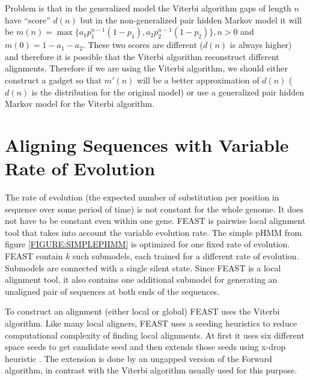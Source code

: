 Problem is that in the generalized model the Viterbi algorithm gaps of length
$n$ have ``score'' $d(n)$ but in the non-generalized pair hidden Markov model it
will be $m(n)=\max\{a_1p_1^{n-1}(1-p_1),a_2p_2^{n-1}(1-p_2)\}, n>0$ and
$m(0)=1-a_1-a_2$.  These two scores are different ($d(n)$ is always higher) and
therefore it is possible that the Viterbi algorithm reconstruct different
alignments. Therefore if we are using the Viterbi algorithm, we should either
construct a gadget so that $m'(n)$ will be a better approximation of $d(n)$
($d(n)$ is the distribution for the original model) or use a generalized pair
hidden Markov model for the Viterbi algorithm.


\section{Aligning Sequences with Variable Rate of Evolution}
\label{SECTION:FEAST} 

The rate of evolution (the expected number of substitution per position in
sequence over some period of time) is not constant for the whole genome. It does
not have to be constant even within one gene. FEAST is pairwise local alignment
tool \cite{FEAST2011} that takes into account the variable evolution rate. The
simple pHMM from figure \ref{FIGURE:SIMPLEPHMM} is optimized for one fixed rate
of evolution.  FEAST contain $k$ such submodels, each trained for a different
rate of evolution.  Submodels are connected with a single silent state.  Since
FEAST is a local alignment tool, it also contains one additional submodel for
generating an unaligned pair of  sequences  at both ends of the sequences.

To construct an alignment (either local or global) FEAST uses the Viterbi
algorithm. Like many local aligners, FEAST uses a seeding heuristics to reduce
computational complexity of finding local alignments.  At first it uses six
different space seeds to get candidate seed and then extends those seeds using
x-drop heuristic \cite{Altschul1997}. The extension is done by an ungapped
version of the Forward algorithm, in contrast with the Viterbi algorithm usually
used for this purpose. 

